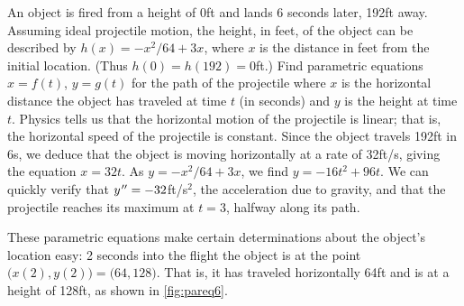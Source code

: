 \begin{example}\label{ex_pareq6}%
An object is fired from a height of 0ft and lands 6 seconds later, 192ft away. Assuming ideal projectile motion, the height, in feet, of the object can be described by $h(x) = -x^2/64+3x$, where $x$ is the distance in feet from the initial location. (Thus $h(0) = h(192) = 0$ft.) Find parametric equations $x=f(t)$, $y=g(t)$ for the path of the projectile where $x$ is the horizontal distance the object has traveled at time $t$ (in seconds) and $y$ is the height at time $t$.
\solution
Physics tells us that the horizontal motion of the projectile is linear; that is, the horizontal speed of the projectile is constant. Since the object travels 192ft in 6s, we deduce that the object is moving horizontally at a rate of 32ft/s, giving the equation $x=32t$. As $y=-x^2/64+3x$, we find $y= -16t^2+96t$. We can quickly verify that $y\primeskip''=-32$ft/s$^2$, the acceleration due to gravity, and that the projectile reaches its maximum at $t=3$, halfway along its path.


These parametric equations make certain determinations about the object's location easy: 2 seconds into the flight the object is at the point $\bigl(x(2),y(2)\bigr) = \bigl(64,128\bigr)$. That is, it has traveled horizontally 64ft and is at a height of 128ft, as shown in \autoref{fig:pareq6}.
\end{example}

